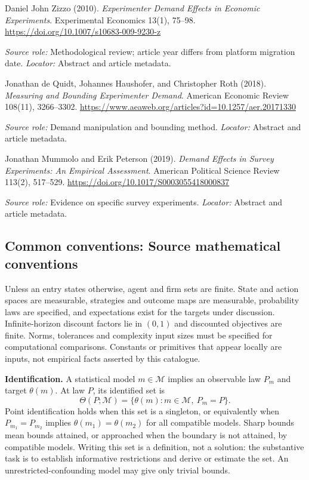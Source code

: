 \documentclass[11pt,a4paper]{article}
\begin{document}
\begin{enumerate}[label={[S\arabic*]},leftmargin=*]

\item Daniel John Zizzo (2010). \emph{Experimenter Demand Effects in Economic Experiments}. Experimental Economics 13(1), 75--98. \url{https://doi.org/10.1007/s10683-009-9230-z}\par \textit{Source role:} Methodological review; article year differs from platform migration date. \textit{Locator:} Abstract and article metadata.

\item Jonathan de Quidt, Johannes Haushofer, and Christopher Roth (2018). \emph{Measuring and Bounding Experimenter Demand}. American Economic Review 108(11), 3266--3302. \url{https://www.aeaweb.org/articles?id=10.1257/aer.20171330}\par \textit{Source role:} Demand manipulation and bounding method. \textit{Locator:} Abstract and article metadata.

\item Jonathan Mummolo and Erik Peterson (2019). \emph{Demand Effects in Survey Experiments: An Empirical Assessment}. American Political Science Review 113(2), 517--529. \url{https://doi.org/10.1017/S0003055418000837}\par \textit{Source role:} Evidence on specific survey experiments. \textit{Locator:} Abstract and article metadata.

\end{enumerate}

\subsection*{Common conventions: Source mathematical conventions}

Unless an entry states otherwise, agent and firm sets are finite. State and action spaces are measurable, strategies and outcome maps are measurable, probability laws are specified, and expectations exist for the targets under discussion. Infinite-horizon discount factors lie in $(0,1)$ and discounted objectives are finite. Norms, tolerances and complexity input sizes must be specified for computational comparisons. Constants or primitives that appear locally are inputs, not empirical facts asserted by this catalogue.

\textbf{Identification.} A statistical model $m\in\mathcal M$ implies an observable law $P_m$ and target $\theta(m)$. At law $P$, its identified set is
\[
\Theta(P;\mathcal M)=\{\theta(m):m\in\mathcal M,\ P_m=P\}.
\]
Point identification holds when this set is a singleton, or equivalently when $P_{m_1}=P_{m_2}$ implies $\theta(m_1)=\theta(m_2)$ for all compatible models. Sharp bounds mean bounds attained, or approached when the boundary is not attained, by compatible models. Writing this set is a definition, not a solution: the substantive task is to establish informative restrictions and derive or estimate the set. An unrestricted-confounding model may give only trivial bounds.
\end{document}
